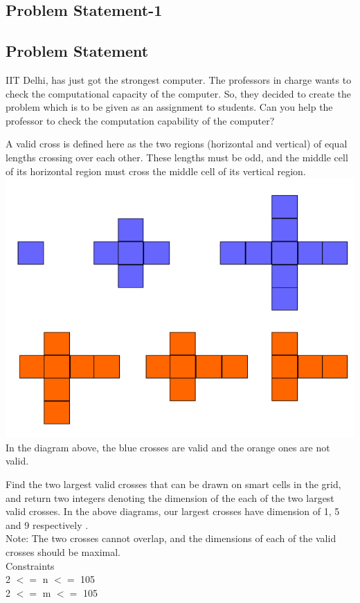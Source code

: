 \documentclass[a4paper,12pt]{article}
\begin{document}
\begin{flushleft}
\newpage
\tableofcontents

\section{\large{Problem Statement-1}} 
\subsection{Problem Statement}
IIT Delhi, has just got the strongest computer. The professors in charge wants to check the computational capacity of the computer. So, they decided to create the problem which is to be given as an assignment to students. Can you help the professor to check the computation capability of the computer?

A valid cross is defined here as the two regions (horizontal and vertical) of equal lengths crossing over each other. These lengths must be odd, and the middle cell of its horizontal region must cross the middle cell of its vertical region.
\includegraphics[scale=0.5]{ps1_1.png}\\
In the diagram above, the blue crosses are valid and the orange ones are not valid. 


Find the two largest valid crosses that can be drawn on smart cells in the grid, and return two integers denoting the dimension of the each of the two largest valid crosses. In the above diagrams, our largest crosses have dimension of 1,  5 and 9 respectively .\\

Note: The two crosses cannot overlap, and the dimensions of each of the valid crosses should be maximal.\\
Constraints\\
2 $<=$ n $<=$ 105\\
2 $<=$ m $<=$ 105\\




\end{flushleft}
\end{document}
